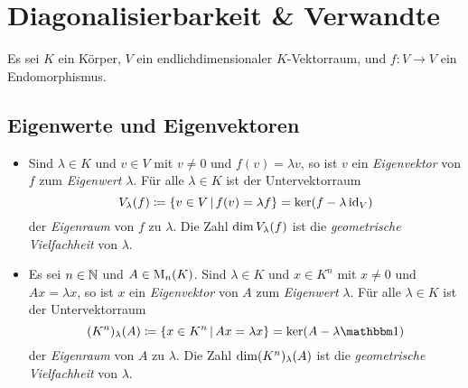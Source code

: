\chapter{Diagonalisierbarkeit \& Verwandte}

Es sei $K$ ein Körper, $V$ ein endlichdimensionaler $K$-Vektorraum, und $f \colon V \to V$ ein Endomorphismus.





\section{Eigenwerte und Eigenvektoren}

\begin{definition}
  \leavevmode
  \begin{itemize}
    \item
      Sind $\lambda \in K$ und $v \in V$ mit $v \neq 0$ und $f(v) = \lambda v$, so ist $v$ ein \emph{Eigenvektor} von $f$ zum \emph{Eigenwert} $\lambda$.
      Für alle $\lambda \in K$ ist der Untervektorraum
      \[
                  V_{\lambda}(f)
        \coloneqq \{ v \in V \,|\, f(v) = \lambda f \}
        =         \ker (f - \lambda \operatorname{id}_V)
      \]
      der \emph{Eigenraum} von $f$ zu $\lambda$.
      Die Zahl $\dim V_{\lambda}(f)$ ist die \emph{geometrische Vielfachheit} von $\lambda$.
    \item
      Es sei $n \in \mathbb{N}$ und $A \in \operatorname{M}_{n}(K)$.
      Sind $\lambda \in K$ und $x \in K^n$ mit $x \neq 0$ und $Ax = \lambda x$, so ist $x$ ein \emph{Eigenvektor} von $A$ zum \emph{Eigenwert} $\lambda$.
      Für alle $\lambda \in K$ ist der Untervektorraum
      \[
                  \eigenspace{(K^n)}{A}{\lambda}
        \coloneqq \{ x \in K^n \suchthat Ax = \lambda x \}
        =         \ker (A - \lambda \Id)
      \]
      der \emph{Eigenraum} von $A$ zu $\lambda$.
      Die Zahl $\dim (K^n)_{\lambda}(A)$ ist die \emph{geometrische Vielfachheit} von $\lambda$.
  \end{itemize}
\end{definition}

